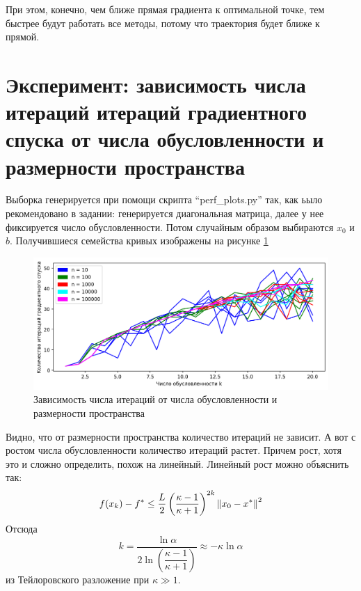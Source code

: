 \documentclass[notitlepage]{article}
\begin{document}
При этом, конечно, чем ближе прямая градиента к оптимальной точке, тем быстрее будут работать все методы, потому что траектория будет
ближе к прямой.

\section*{Эксперимент: зависимость числа итераций итераций градиентного спуска от числа обусловленности и размерности пространства}
Выборка генерируется при помощи скрипта ``perf\_plots.py'' так, как ьыло рекомендовано в задании:
генерируется диагональная матрица, далее у нее фиксируется число обусловленности. Потом случайным образом выбираются $x_0$ и $b$.
Получившиеся семейства кривых изображены на рисунке \ref{fig:perfplot}
\begin{figure}[ht]
  \centering
  \includegraphics[width=\linewidth, keepaspectratio]{plots/perf_gradients.png}
  \caption{Зависимость числа итераций от числа обусловленности и размерности пространства}
  \label{fig:perfplot}
\end{figure}

Видно, что от размерности пространства количество итераций не зависит. А вот с ростом числа обусловленности количество
итераций растет. Причем рост, хотя это и сложно определить, похож на линейный. Линейный рост можно объяснить так:
\begin{equation}
  f(x_k) - f^* \leq \frac L2 \left(\frac{\kappa - 1}{\kappa + 1}\right)^{2k} \norm{x_0 - x^*}^2
\end{equation}
Отсюда
\begin{equation}
  k = \frac{\ln\alpha}{2\ln\left(\dfrac{\kappa - 1}{\kappa + 1}\right)} \approx -\kappa\ln\alpha 
\end{equation}
из Тейлоровского разложение при $\kappa \gg 1$.


			
			
\end{document}
